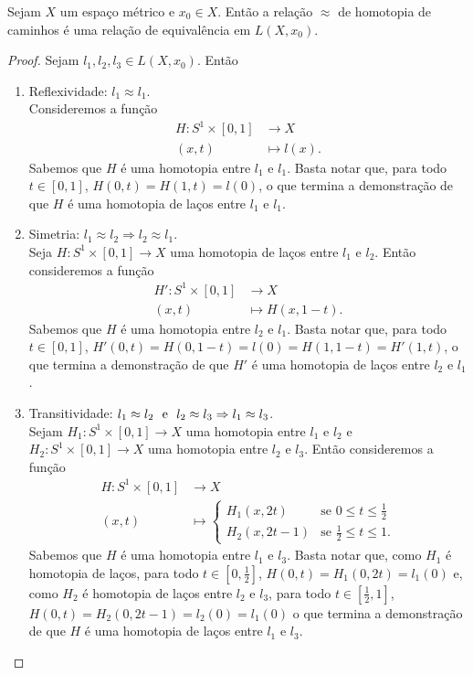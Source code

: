 \begin{proposition}
	Sejam $X$ um espaço métrico e $x_0 \in X$. Então a relação $\approx$ de homotopia de caminhos é uma relação de equivalência em $L(X,x_0)$.
\end{proposition}
\begin{proof} Sejam $l_1,l_2,l_3 \in L(X,x_0)$. Então
	\begin{enumerate}
	\item Reflexividade: $l_1 \approx l_1$. \\
	Consideremos a função
		\begin{align*}
		H: S^1 \times [0,1] &\to X \\
		(x,t) &\mapsto l(x).
		\end{align*}
Sabemos que $H$ é uma homotopia entre $l_1$ e $l_1$. Basta notar que, para todo $t \in [0,1]$, $H(0,t)=H(1,t)=l(0)$, o que termina a demonstração de que $H$ é uma homotopia de laços entre $l_1$ e $l_1$.
	
	\item Simetria: $l_1 \approx l_2 \Rightarrow l_2 \approx l_1$. \\
	Seja $H: S^1 \times [0,1] \to X$ uma homotopia de laços entre $l_1$ e $l_2$. Então consideremos a função
	\begin{align*}
	H': S^1 \times [0,1] &\to X \\
		(x,t) &\mapsto H(x,1-t).
	\end{align*}		
Sabemos que $H$ é uma homotopia entre $l_2$ e $l_1$. Basta notar que, para todo $t \in [0,1]$, $H'(0,t)=H(0,1-t)=l(0)=H(1,1-t)=H'(1,t)$, o que termina a demonstração de que $H'$ é uma homotopia de laços entre $l_2$ e $l_1$.

	\item Transitividade: $l_1 \approx l_2 \text{\ \ e\ \ } l_2 \approx l_3 \Rightarrow l_1 \approx l_3$. \\
	Sejam $H_1: S^1 \times [0,1] \to X$ uma homotopia entre $l_1$ e $l_2$ e $H_2: S^1 \times [0,1] \to X$ uma homotopia entre $l_2$ e $l_3$. Então consideremos a função
	\begin{align*}
	H: S^1 \times [0,1] &\to X \\
		(x,t) &\mapsto \begin{cases}
						H_1(x,2t) &\text{se $0 \leq t \leq \frac{1}{2}$}\\
						H_2(x,2t-1) &\text{se $\frac{1}{2} \leq t \leq 1$}.
						\end{cases}
	\end{align*}
Sabemos que $H$ é uma homotopia entre $l_1$ e $l_3$. Basta notar que, como $H_1$ é homotopia de laços, para todo $t \in [0,\frac{1}{2}]$, $H(0,t)=H_1(0,2t)=l_1(0)$ e, como $H_2$ é homotopia de laços entre $l_2$ e $l_3$, para todo $t \in [\frac{1}{2},1]$, $H(0,t)=H_2(0,2t-1)=l_2(0)=l_1(0)$ o que termina a demonstração de que $H$ é uma homotopia de laços entre $l_1$ e $l_3$. 
	\end{enumerate}
\end{proof}

